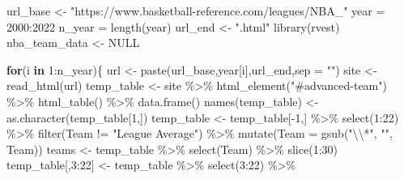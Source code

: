 \documentclass[
  11pt,
]{book}
\newenvironment{Shaded}{\begin{snugshade}}{\end{snugshade}}
\newcommand{\AttributeTok}[1]{\textcolor[rgb]{0.77,0.63,0.00}{#1}}
\newcommand{\ConstantTok}[1]{\textcolor[rgb]{0.00,0.00,0.00}{#1}}
\newcommand{\ControlFlowTok}[1]{\textcolor[rgb]{0.13,0.29,0.53}{\textbf{#1}}}
\newcommand{\DecValTok}[1]{\textcolor[rgb]{0.00,0.00,0.81}{#1}}
\newcommand{\FunctionTok}[1]{\textcolor[rgb]{0.00,0.00,0.00}{#1}}
\newcommand{\NormalTok}[1]{#1}
\newcommand{\OtherTok}[1]{\textcolor[rgb]{0.56,0.35,0.01}{#1}}
\newcommand{\SpecialCharTok}[1]{\textcolor[rgb]{0.00,0.00,0.00}{#1}}
\newcommand{\StringTok}[1]{\textcolor[rgb]{0.31,0.60,0.02}{#1}}
\theoremstyle{definition}
\theoremstyle{definition}
\theoremstyle{definition}
\theoremstyle{definition}
\theoremstyle{remark}
\begin{document}
\begin{Shaded}
\begin{Highlighting}[]
\NormalTok{url\_base }\OtherTok{\textless{}{-}} \StringTok{"https://www.basketball{-}reference.com/leagues/NBA\_"}
\NormalTok{year }\OtherTok{=} \DecValTok{2000}\SpecialCharTok{:}\DecValTok{2022}
\NormalTok{n\_year }\OtherTok{=} \FunctionTok{length}\NormalTok{(year)}
\NormalTok{url\_end }\OtherTok{\textless{}{-}} \StringTok{".html"}
\FunctionTok{library}\NormalTok{(rvest)}
\NormalTok{nba\_team\_data }\OtherTok{\textless{}{-}} \ConstantTok{NULL}

\ControlFlowTok{for}\NormalTok{(i }\ControlFlowTok{in} \DecValTok{1}\SpecialCharTok{:}\NormalTok{n\_year)\{}
\NormalTok{  url }\OtherTok{\textless{}{-}} \FunctionTok{paste}\NormalTok{(url\_base,year[i],url\_end,}\AttributeTok{sep =} \StringTok{""}\NormalTok{)}
\NormalTok{  site }\OtherTok{\textless{}{-}} \FunctionTok{read\_html}\NormalTok{(url)}
\NormalTok{  temp\_table }\OtherTok{\textless{}{-}}\NormalTok{ site }\SpecialCharTok{\%\textgreater{}\%} \FunctionTok{html\_element}\NormalTok{(}\StringTok{"\#advanced{-}team"}\NormalTok{) }\SpecialCharTok{\%\textgreater{}\%} \FunctionTok{html\_table}\NormalTok{() }\SpecialCharTok{\%\textgreater{}\%} \FunctionTok{data.frame}\NormalTok{()}
  \FunctionTok{names}\NormalTok{(temp\_table) }\OtherTok{\textless{}{-}} \FunctionTok{as.character}\NormalTok{(temp\_table[}\DecValTok{1}\NormalTok{,])}
\NormalTok{  temp\_table }\OtherTok{\textless{}{-}}\NormalTok{ temp\_table[}\SpecialCharTok{{-}}\DecValTok{1}\NormalTok{,] }\SpecialCharTok{\%\textgreater{}\%} 
    \FunctionTok{select}\NormalTok{(}\DecValTok{1}\SpecialCharTok{:}\DecValTok{22}\NormalTok{) }\SpecialCharTok{\%\textgreater{}\%} 
    \FunctionTok{filter}\NormalTok{(Team }\SpecialCharTok{!=} \StringTok{"League Average"}\NormalTok{) }\SpecialCharTok{\%\textgreater{}\%} 
    \FunctionTok{mutate}\NormalTok{(}\AttributeTok{Team =} \FunctionTok{gsub}\NormalTok{(}\StringTok{"}\SpecialCharTok{\textbackslash{}\textbackslash{}}\StringTok{*"}\NormalTok{, }\StringTok{""}\NormalTok{, Team))}
\NormalTok{  teams }\OtherTok{\textless{}{-}}\NormalTok{ temp\_table }\SpecialCharTok{\%\textgreater{}\%} \FunctionTok{select}\NormalTok{(Team) }\SpecialCharTok{\%\textgreater{}\%} \FunctionTok{slice}\NormalTok{(}\DecValTok{1}\SpecialCharTok{:}\DecValTok{30}\NormalTok{)}
\NormalTok{  temp\_table[,}\DecValTok{3}\SpecialCharTok{:}\DecValTok{22}\NormalTok{] }\OtherTok{\textless{}{-}}\NormalTok{ temp\_table }\SpecialCharTok{\%\textgreater{}\%} \FunctionTok{select}\NormalTok{(}\DecValTok{3}\SpecialCharTok{:}\DecValTok{22}\NormalTok{) }\SpecialCharTok{\%\textgreater{}\%}

\end{Highlighting}
\end{Shaded}
\end{document}

